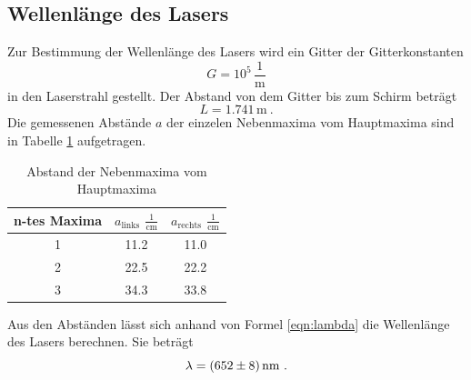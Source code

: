 \subsection{Wellenlänge des Lasers}
Zur Bestimmung der Wellenlänge des Lasers wird ein Gitter der Gitterkonstanten 
\begin{equation}
  G = 10^5 \, \frac{1}{\text{m}}
  \label{eqn:constg}
\end{equation}
in den Laserstrahl gestellt. Der Abstand von dem Gitter bis zum Schirm beträgt
\begin{equation}
  L = 1.741 \, \text{m} \ .
  \label{eqn:K}
\end{equation}
Die gemessenen Abstände $a$ der einzelen Nebenmaxima vom Hauptmaxima sind in Tabelle \ref{tab:max} aufgetragen.
\begin{table}
  \centering
  \begin{tabular}{c c c}
    \toprule
    n-tes Maxima & $a_\text{links}$ $\frac{1}{\text{cm}}$ & $a_\text{rechts}$ $\frac{1}{\text{cm}}$ \\
    \midrule
	1 & 11.2 & 11.0 \\
	2 & 22.5 & 22.2 \\
	3 & 34.3 & 33.8 \\
    \bottomrule
  \end{tabular}
  \caption{Abstand der Nebenmaxima vom Hauptmaxima}
  \label{tab:max}
\end{table}
Aus den Abständen lässt sich anhand von Formel \ref{eqn:lambda} die Wellenlänge des Lasers berechnen. Sie beträgt 
\begin{equation}
  \lambda = (\num{652 +- 8}) \, \text{nm} \ .
\end{equation}
